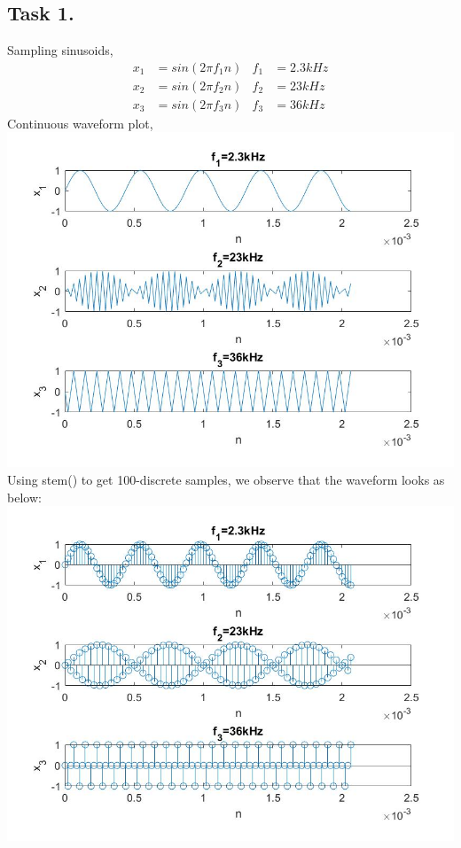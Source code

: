 \documentclass{article}
\begin{document}
    \subsection{Task 1.} Sampling sinusoids,
        \begin{align*}
            x_1&=sin(2 \pi f_1 n) & f_1&=2.3kHz\\
            x_2&=sin(2 \pi f_2 n) & f_2&=23kHz\\
            x_3&=sin(2 \pi f_3 n) & f_3&=36kHz
        \end{align*}
        Continuous waveform plot,
        \flushleft\includegraphics[width=\textwidth]{task1b.jpg}
        Using stem() to get 100-discrete samples, we observe that the waveform looks as below:
        \flushleft\includegraphics[width=\textwidth]{task1a.jpg}
\end{document}
